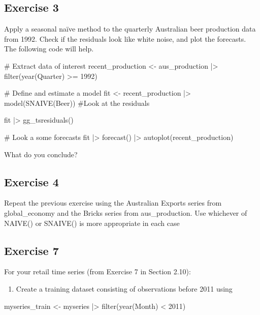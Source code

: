 \documentclass[
  11pt,
]{article}
\newenvironment{Shaded}{\begin{snugshade}}{\end{snugshade}}
\newcommand{\NormalTok}[1]{\textcolor[rgb]{0.00,0.23,0.31}{#1}}
\providecommand{\tightlist}{%
  \setlength{\itemsep}{0pt}\setlength{\parskip}{0pt}}\usepackage{longtable,booktabs,array}
\begin{document}
\subsection{Exercise 3}\label{exercise-3}

Apply a seasonal naïve method to the quarterly Australian beer
production data from 1992. Check if the residuals look like white noise,
and plot the forecasts. The following code will help.

\begin{Shaded}
\begin{Highlighting}[]
\NormalTok{\# Extract data of interest}
\NormalTok{recent\_production \textless{}{-} aus\_production |\textgreater{}}
\NormalTok{  filter(year(Quarter) \textgreater{}= 1992)}

\NormalTok{\# Define and estimate a model}
\NormalTok{fit \textless{}{-} recent\_production |\textgreater{} model(SNAIVE(Beer))}
\NormalTok{\#Look at the residuals}

\NormalTok{fit |\textgreater{} gg\_tsresiduals()}

\NormalTok{\# Look a some forecasts}
\NormalTok{fit |\textgreater{} forecast() |\textgreater{} autoplot(recent\_production)}
\end{Highlighting}
\end{Shaded}

What do you conclude?

\subsection{Exercise 4}\label{exercise-4}

Repeat the previous exercise using the Australian Exports series from
global\_economy and the Bricks series from aus\_production. Use
whichever of NAIVE() or SNAIVE() is more appropriate in each case

\subsection{Exercise 7}\label{exercise-7}

For your retail time series (from Exercise 7 in Section 2.10):

\begin{enumerate}
\def\labelenumi{\alph{enumi}.}
\tightlist
\item
  Create a training dataset consisting of observations before 2011 using
\end{enumerate}

\begin{Shaded}
\begin{Highlighting}[]
\NormalTok{myseries\_train \textless{}{-} myseries |\textgreater{}}
\NormalTok{  filter(year(Month) \textless{} 2011)}
\end{Highlighting}
\end{Shaded}
\end{document}
